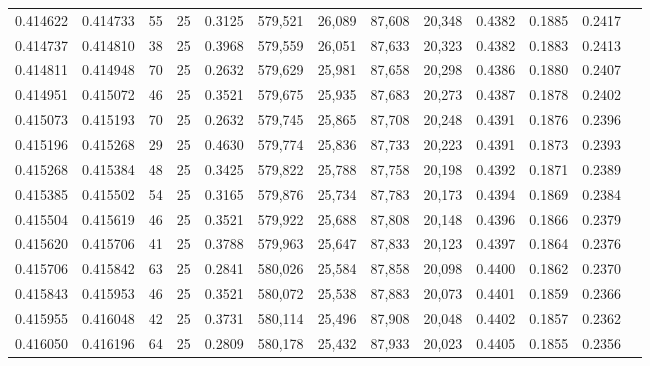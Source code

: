 \begin{tabular}{rrrrrrrrrrrrr}
0.414622 & 0.414733 &    55 &  25 &                                     0.3125 & 579,521 &  26,089 &  87,608 &  20,348 & 0.4382 & 0.1885 & 0.2417 \\
0.414737 & 0.414810 &    38 &  25 &                                     0.3968 & 579,559 &  26,051 &  87,633 &  20,323 & 0.4382 & 0.1883 & 0.2413 \\
0.414811 & 0.414948 &    70 &  25 &                                     0.2632 & 579,629 &  25,981 &  87,658 &  20,298 & 0.4386 & 0.1880 & 0.2407 \\
0.414951 & 0.415072 &    46 &  25 &                                     0.3521 & 579,675 &  25,935 &  87,683 &  20,273 & 0.4387 & 0.1878 & 0.2402 \\
0.415073 & 0.415193 &    70 &  25 &                                     0.2632 & 579,745 &  25,865 &  87,708 &  20,248 & 0.4391 & 0.1876 & 0.2396 \\
0.415196 & 0.415268 &    29 &  25 &                                     0.4630 & 579,774 &  25,836 &  87,733 &  20,223 & 0.4391 & 0.1873 & 0.2393 \\
0.415268 & 0.415384 &    48 &  25 &                                     0.3425 & 579,822 &  25,788 &  87,758 &  20,198 & 0.4392 & 0.1871 & 0.2389 \\
0.415385 & 0.415502 &    54 &  25 &                                     0.3165 & 579,876 &  25,734 &  87,783 &  20,173 & 0.4394 & 0.1869 & 0.2384 \\
0.415504 & 0.415619 &    46 &  25 &                                     0.3521 & 579,922 &  25,688 &  87,808 &  20,148 & 0.4396 & 0.1866 & 0.2379 \\
0.415620 & 0.415706 &    41 &  25 &                                     0.3788 & 579,963 &  25,647 &  87,833 &  20,123 & 0.4397 & 0.1864 & 0.2376 \\
0.415706 & 0.415842 &    63 &  25 &                                     0.2841 & 580,026 &  25,584 &  87,858 &  20,098 & 0.4400 & 0.1862 & 0.2370 \\
0.415843 & 0.415953 &    46 &  25 &                                     0.3521 & 580,072 &  25,538 &  87,883 &  20,073 & 0.4401 & 0.1859 & 0.2366 \\
0.415955 & 0.416048 &    42 &  25 &                                     0.3731 & 580,114 &  25,496 &  87,908 &  20,048 & 0.4402 & 0.1857 & 0.2362 \\
0.416050 & 0.416196 &    64 &  25 &                                     0.2809 & 580,178 &  25,432 &  87,933 &  20,023 & 0.4405 & 0.1855 & 0.2356 \\

\end{tabular}
